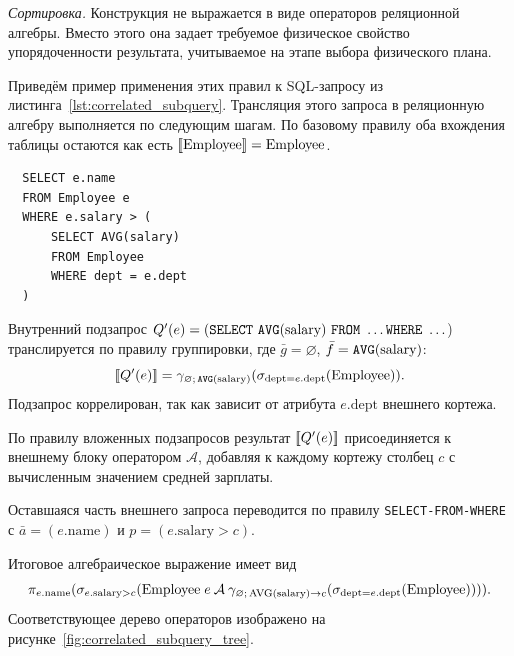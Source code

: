 \documentclass[14pt, russian]{scrartcl}
\begin{document}
\emph{Сортировка.} Конструкция \ORDERBY{} не выражается в виде
операторов реляционной алгебры. Вместо этого она задает требуемое
физическое свойство упорядоченности результата, учитываемое на этапе
выбора физического плана.

Приведём пример применения этих правил к SQL-запросу из
листинга~\ref{lst:correlated_subquery}. Трансляция этого запроса в реляционную
алгебру выполняется по следующим шагам. По базовому правилу оба вхождения
таблицы остаются как есть \([\![ \text{Employee} ]\!] = \text{Employee}\).

\begin{listing}[H]
  \caption{Запрос с коррелированным подзапросом.}
  \label{lst:correlated_subquery}
  \begin{verbatim}
  SELECT e.name
  FROM Employee e
  WHERE e.salary > (
      SELECT AVG(salary)
      FROM Employee
      WHERE dept = e.dept
  )
  \end{verbatim}
\end{listing}


Внутренний подзапрос
\(Q'(e) = (\SELECT\ \AVG(\text{salary})\ \FROM\ \ldots \WHERE\ \ldots\))
транслируется по правилу группировки, где \(\bar{g} = \varnothing\),
\(\bar{f} = \texttt{AVG}(\text{salary})\):
\[
  [\![ Q'(e) ]\!] = \gamma_{\varnothing;\,\texttt{AVG}(\text{salary})}(\sigma_{\text{dept} = e.\text{dept}}(\text{Employee})).
\]
\noindent{} Подзапрос коррелирован, так как зависит от атрибута
\(e.\text{dept}\) внешнего кортежа.

По правилу вложенных подзапросов результат \([\![ Q'(e) ]\!]\) присоединяется к
внешнему блоку оператором \(\mathcal{A}\), добавляя к каждому кортежу столбец
\(c\) с вычисленным значением средней зарплаты.

Оставшаяся часть внешнего запроса переводится по правилу
\texttt{SELECT-FROM-WHERE} с \(\bar{a} = (e.\text{name})\) и
\(p = (e.\text{salary} > c)\).

Итоговое алгебраическое выражение имеет вид
\[
  \pi_{e.\text{name}}(\sigma_{e.\text{salary} > c}(\text{Employee}\;e \mathbin{\mathcal{A}} \gamma_{\varnothing;\,\text{AVG}(\text{salary}) \to c}(\sigma_{\text{dept} = e.\text{dept}}(\text{Employee})))).
\]
\noindent{} Соответствующее дерево операторов изображено на
рисунке~\ref{fig:correlated_subquery_tree}.
\end{document}
